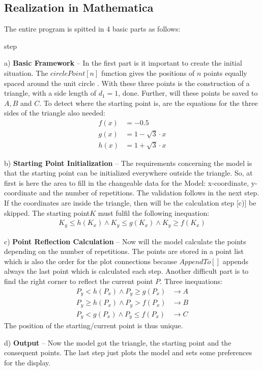 \documentclass[11pt,a4paper]{article}
\begin{document}
 \subsection{Realization in Mathematica}
The entire program is spitted in 4 basic parts as follows:
\begin{labeling}{step}
\item [a)] \textbf{Basic Framework} – In the first part is it important to create the initial situation. The \(circlePoint[n]\) function gives the positions of \(n\) points equally spaced around the unit circle \cite{doc}. With these three points is the construction of a triangle, with a side length of \(d_1=1\), done. Further, will these points be saved to \(A, B\) and \(C\). To detect where the starting point is, are the equations for the three sides of the triangle also needed:
\begin{align}
f(x) &=-0.5\\
g(x) &=1-\sqrt{3}\cdot x\\
h(x) &=1+\sqrt{3}\cdot x
\end{align}
\item [b)] \textbf{Starting Point Initialization} – The requirements concerning the model is that the starting point can be initialized everywhere outside the triangle. So, at first is here the area to fill in the changeable data for the Model: x-coordinate, y-coordinate and the number of repetitions. The validation follows in the next step. If the coordinates are inside the triangle, then will be the calculation step [c)] be skipped. The starting point\(K\) must fulfil the following inequation:
\begin{align}
 K_y \le h(K_x) \land K_y \le g(K_x) \land K_y \ge f(K_x)
\end{align}
\item [c)] \textbf{Point Reflection Calculation} – Now will the model calculate the points depending on the number of repetitions. The points are stored in a point list which is also the order for the plot connections because \(AppendTo[]\) appends always the last point which is calculated each step. Another difficult part is to find the right corner to reflect the current point \(P\). Three inequations:
\begin{align}
P_y < h(P_x) \land P_y \ge g(P_x) &\rightarrow A\\
P_y \ge h(P_x) \land P_y > f(P_x) &\rightarrow B\\
P_y < g(P_x) \land P_y \le f(P_x) &\rightarrow C
\end{align}
The position of the starting/current point is thus unique.
\item [d)] \textbf{Output} – Now the model got the triangle, the starting point and the consequent points. The last step just plots the model and sets some preferences for the display.
\end{labeling}
\end{document}

